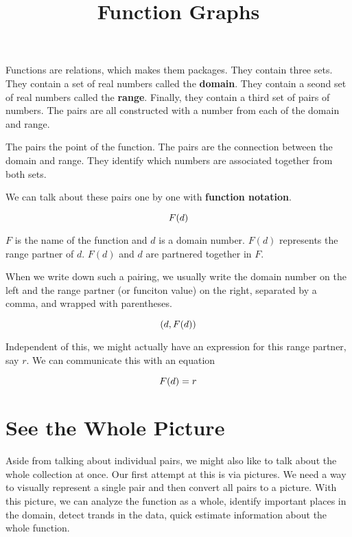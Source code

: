 \documentclass{ximera}
\title{Function Graphs}
\begin{document}
\begin{abstract}

\end{abstract}
\maketitle


Functions are relations, which makes them packages.  They contain three sets.  They contain a set of real numbers called the \textbf{domain}.  They contain a seond set of real numbers called the \textbf{range}. Finally, they contain a third set of pairs of numbers.  The pairs are all constructed with a number from each of the domain and range.

The pairs the point of the function.  The pairs are the connection between the domain and range.  They identify which numbers are associated together from both sets.

We can talk about these pairs one by one with \textbf{function notation}.

\[
\large{F(d)}
\]


$F$ is the name of the function and $d$ is a domain number.  $F(d)$ represents the range partner of $d$.  $F(d)$ and $d$ are partnered together in $F$.

When we write down such a pairing, we usually write  the domain number on the left and the range partner (or funciton value) on the right, separated by a comma, and wrapped with parentheses.

\[ 
\large{(d, F(d))} 
\]

Independent of this, we might actually have an expression for this range partner, say $r$.  We can communicate this with an equation


\[
\large{F(d)} = r
\]


\section{See the Whole Picture}

Aside from talking about individual pairs, we might also like to talk about the whole collection at once.  Our first attempt at this is via pictures. We need a way to visually represent a single pair and then convert all pairs to a picture.  With this picture, we can analyze the function as a whole, identify important places in the domain, detect trands in the data, quick estimate information about the whole function.
\end{document}
